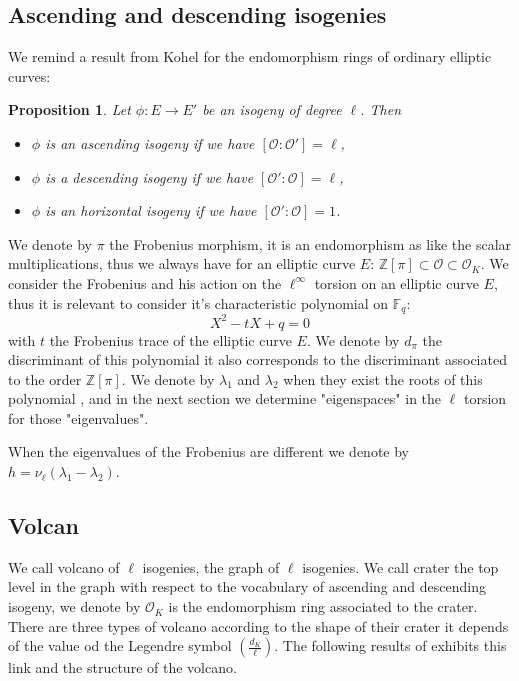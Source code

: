 \documentclass{lms}
\newtheorem{prop}[thm]{Proposition}
\begin{document}
\subsection{Ascending and descending isogenies}
We remind a result from Kohel \cite{Kohel} for the endomorphism rings of ordinary elliptic curves:
\begin{prop}
Let $\phi:E \rightarrow E'$ be an isogeny of degree $\ell$. Then 
\begin{itemize}
\item $\phi$ is an ascending isogeny if we have $[\mathcal{O}:\mathcal{O'}]=\ell$,
\item $\phi$ is a descending isogeny if we have $[\mathcal{O'}:\mathcal{O}]=\ell$,
\item $\phi$ is an horizontal isogeny if we have $[\mathcal{O'}:\mathcal{O}]=1$.
\end{itemize}
\end{prop}
We denote by $\pi$ the Frobenius morphism, it is an endomorphism as like the scalar multiplications, thus we always have for an elliptic curve $E$:
$\mathbb{Z}[\pi] \subset \mathcal{O} \subset \mathcal{O}_K$.
We consider the Frobenius and his action on the $\ell^{\infty}$ torsion on an elliptic curve $E$, thus it is relevant to consider it's characteristic polynomial on $\mathbb{F}_q$:
\begin{equation}
X^2 - tX +q = 0
\end{equation}
with $t$ the Frobenius trace of the elliptic curve $E$. We denote by $d_{\pi}$ the discriminant of this polynomial it also corresponds to the discriminant associated to the order $\mathbb{Z}[\pi]$. We denote by $\lambda_1$ and $\lambda_2$ when they exist the roots of this polynomial , and in the next section we  determine "eigenspaces" in the $\ell$ torsion for those "eigenvalues".

\begin{defi}
When the eigenvalues of the Frobenius are different we denote by $h=\nu_{\ell}(\lambda_1-\lambda_2)$.
\end{defi}



\subsection{Volcan}
We call volcano of $\ell$ isogenies, the graph of $\ell$ isogenies. 
We call crater the top level in the graph with respect to the vocabulary of ascending and descending isogeny, we denote by $\mathcal{O}_K$ is the endomorphism ring associated to the crater. There are three types of volcano according to the shape of their crater it depends of the value od the Legendre symbol  $\left( \frac{d_{K}}{\ell} \right)$. The following results of \cite{kohel} exhibits this link and the structure of the volcano.
\end{document}
